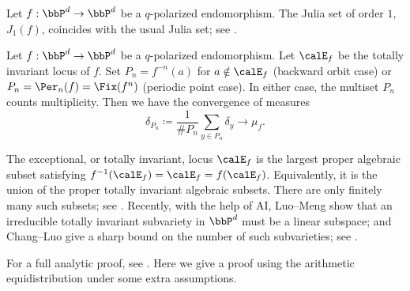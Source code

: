 \begin{remark}[label=\labelNFM{rmk:Julia-set-of-order1-and-usual-Julia-set}, status=draft, tag=0000000]
	Let $f: \bbP^d \to \bbP^d$ be a $q$-polarized endomorphism.
	The Julia set of order $1$, $J_1(f)$, coincides with the usual Julia set; see \cite[Theorem 1.22]{Dinh-Sibony-2010-DynamicsSeveralComplex}.
\end{remark}

\begin{theorem}[label=\labelNFM{thm:equidistribution-of-backforward-orbit-and-periodic-points}, status=draft, tag=0000000]
	Let $f: \bbP^d \to \bbP^d$ be a $q$-polarized endomorphism.
	Let $\calE_f$ be the totally invariant locus of $f$.
	Set $P_n = f^{-n}(a)$ for $a \notin \calE_f$ (backward orbit case) or $P_n = \Per_n(f) = \Fix(f^n)$ (periodic point case).
	In either case, the multiset $P_n$ counts multiplicity.
	Then we have the convergence of measures
	\[ \delta_{P_n} \coloneqq \frac{1}{\# P_n} \sum_{y \in P_n} \delta_y \to \mu_f. \]
\end{theorem}

\begin{remark}[label=\labelNFM{rmk:the-totally-invariant-locus-and-its-linearity}, status=draft, tag=0000000]
	The exceptional, or totally invariant, locus $\calE_f$ is the largest proper algebraic subset satisfying $f^{-1}(\calE_f) = \calE_f = f(\calE_f)$.
	Equivalently, it is the union of the proper totally invariant algebraic subsets.
	There are only finitely many such subsets; see \cite[Theorem 1.47]{Dinh-Sibony-2010-DynamicsSeveralComplex}.
	Recently, with the help of AI, Luo--Meng show that an irreducible totally invariant subvariety in $\bbP^d$ must be a linear subspace; and Chang--Luo give a sharp bound on the number of such subvarieties; see \cite{Luo-Meng-2026-TotallyInvariantSubvarieties,Chang-Luo-2026-SharpBoundsTotally}.
\end{remark}

For a full analytic proof, see \cite[Section 1.4]{Dinh-Sibony-2010-DynamicsSeveralComplex}.
Here we give a proof using the arithmetic equidistribution under some extra assumptions.

